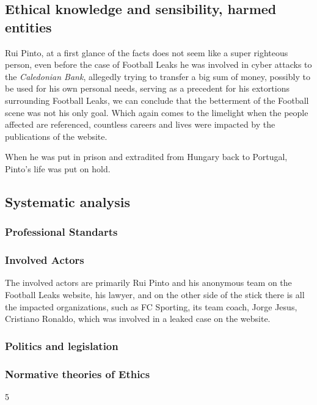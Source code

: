 \subsection{Ethical knowledge and sensibility, harmed entities}
Rui Pinto, at a first glance of the facts does not seem like a super righteous person, even before the case of Football Leaks he was involved in cyber attacks to the \textit{Caledonian Bank}, allegedly trying to transfer a big sum of money, possibly to be used for his own personal needs, serving as a precedent for his extortions surrounding Football Leaks, we can conclude that the betterment of the Football scene was not his only goal.
Which again comes to the limelight when the people affected are referenced, countless careers and lives were impacted by the publications of the website.

When he was put in prison and extradited from Hungary back to Portugal, Pinto's life was put on hold.
% 


\subsection{Systematic analysis}
\subsubsection{Professional Standarts}
\subsubsection{Involved Actors}
The involved actors are primarily Rui Pinto and his anonymous team on the Football Leaks website, his lawyer, and on the other side of the stick there is all the impacted organizations, such as FC Sporting, its team coach, Jorge Jesus, Cristiano Ronaldo, which was involved in a leaked case on the website.
\subsubsection{Politics and legislation}
\subsubsection{Normative theories of Ethics}


    5